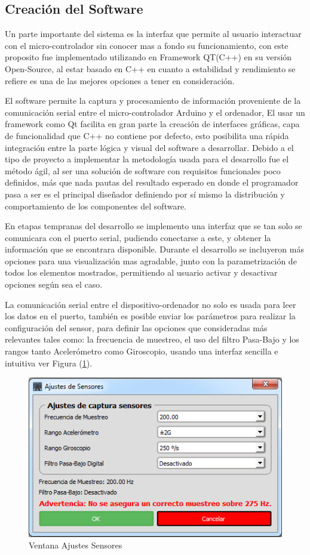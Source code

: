 \documentclass[12pt,a4paper]{article}
\begin{document}
\subsection{Creación del Software}
Un parte importante del sistema es la interfaz que permite al usuario interactuar con el micro-controlador sin conocer mas a fondo su funcionamiento,
con este proposito fue implementado utilizando en Framework QT(C++)\cite{QT} en su versión Open-Source, al estar basado en C++ en cuanto a estabilidad y rendimiento se refiere es una de las mejores opciones a tener en consideración.

El software permite la captura y procesamiento de información proveniente de la comunicación serial entre el micro-controlador Arduino y el ordenador,
El usar un framework como Qt facilita en gran parte la creación de interfaces gráficas, capa de funcionalidad que C++ no contiene por defecto, esto posibilita una rápida integración entre la parte lógica y visual del software a desarrollar.
Debido a el tipo de proyecto a implementar la metodología usada para el desarrollo fue el método ágil, al ser una solución de software con requisitos funcionales poco definidos, más que nada pautas del resultado esperado en donde el programador pasa a ser es el principal diseñador definiendo por sí mismo la distribución y comportamiento de los componentes del software.

En etapas tempranas del desarrollo se implemento una interfaz que se tan solo se comunicara con el puerto serial, pudiendo conectarse a este, y obtener la información que se encontrara disponible.
Durante el desarrollo se incluyeron más opciones para una visualización mas agradable, junto con la parametrización de todos los elementos mostrados, permitiendo al usuario activar y desactivar opciones según sea el caso.

La comunicación serial entre el dispositivo-ordenador no solo es usada para leer los datos en el puerto, también es posible enviar los parámetros para realizar la configuración del sensor, para definir las opciones que consideradas más relevantes tales como: la frecuencia de muestreo, el uso del filtro Pasa-Bajo y los rangos tanto Acelerómetro como Giroscopio, usando una interfaz sencilla e intuitiva ver Figura (\ref{fig:ajustessensores}).

\begin{figure}[H]
	\centering
	\includegraphics[scale=0.6]{images/ajustesSensores}
	\caption{Ventana Ajustes Sensores}
	\label{fig:ajustessensores}
\end{figure}
\end{document}
